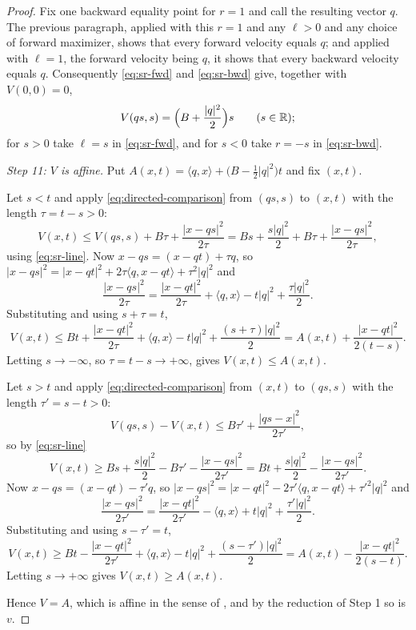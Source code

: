 \begin{proof}
Fix one backward equality point for $r=1$ and call the resulting vector $q$. The
previous paragraph, applied with this $r=1$ and any $\ell>0$ and any choice of
forward maximizer, shows that every forward velocity equals $q$; and applied
with $\ell=1$, the forward velocity being $q$, it shows that every backward
velocity equals $q$. Consequently \eqref{eq:sr-fwd} and \eqref{eq:sr-bwd} give,
together with $V(0,0)=0$,
\begin{equation}\label{eq:sr-line}
  V(qs,s)=\Bigl(B+\frac{|q|^2}{2}\Bigr)s\qquad(s\in\mathbb{R});
\end{equation}
for $s>0$ take $\ell=s$ in \eqref{eq:sr-fwd}, and for $s<0$ take $r=-s$ in
\eqref{eq:sr-bwd}.

\emph{Step 11: $V$ is affine.}
Put $A(x,t)=\langle q,x\rangle+\bigl(B-\tfrac12|q|^2\bigr)t$ and fix $(x,t)$.

Let $s<t$ and apply \eqref{eq:directed-comparison} from $(qs,s)$ to $(x,t)$ with
the length $\tau=t-s>0$:
\[
  V(x,t)\le V(qs,s)+B\tau+\frac{|x-qs|^2}{2\tau}
   =Bs+\frac{s|q|^2}{2}+B\tau+\frac{|x-qs|^2}{2\tau},
\]
using \eqref{eq:sr-line}. Now $x-qs=(x-qt)+\tau q$, so
$|x-qs|^2=|x-qt|^2+2\tau\langle q,x-qt\rangle+\tau^2|q|^2$ and
\[
  \frac{|x-qs|^2}{2\tau}=\frac{|x-qt|^2}{2\tau}+\langle q,x\rangle-t|q|^2
     +\frac{\tau|q|^2}{2}.
\]
Substituting and using $s+\tau=t$,
\[
  V(x,t)\le Bt+\frac{|x-qt|^2}{2\tau}+\langle q,x\rangle-t|q|^2
     +\frac{(s+\tau)|q|^2}{2}
   =A(x,t)+\frac{|x-qt|^2}{2(t-s)} .
\]
Letting $s\to-\infty$, so $\tau=t-s\to+\infty$, gives $V(x,t)\le A(x,t)$.

Let $s>t$ and apply \eqref{eq:directed-comparison} from $(x,t)$ to $(qs,s)$ with
the length $\tau'=s-t>0$:
\[
  V(qs,s)-V(x,t)\le B\tau'+\frac{|qs-x|^2}{2\tau'} ,
\]
so by \eqref{eq:sr-line}
\[
  V(x,t)\ge Bs+\frac{s|q|^2}{2}-B\tau'-\frac{|x-qs|^2}{2\tau'}
   =Bt+\frac{s|q|^2}{2}-\frac{|x-qs|^2}{2\tau'} .
\]
Now $x-qs=(x-qt)-\tau'q$, so
$|x-qs|^2=|x-qt|^2-2\tau'\langle q,x-qt\rangle+\tau'^2|q|^2$ and
\[
  \frac{|x-qs|^2}{2\tau'}=\frac{|x-qt|^2}{2\tau'}-\langle q,x\rangle+t|q|^2
     +\frac{\tau'|q|^2}{2}.
\]
Substituting and using $s-\tau'=t$,
\[
  V(x,t)\ge Bt-\frac{|x-qt|^2}{2\tau'}+\langle q,x\rangle-t|q|^2
     +\frac{(s-\tau')|q|^2}{2}
   =A(x,t)-\frac{|x-qt|^2}{2(s-t)} .
\]
Letting $s\to+\infty$ gives $V(x,t)\ge A(x,t)$.

Hence $V=A$, which is affine in the sense of , and by
the reduction of Step 1 so is $v$.
\end{proof}
